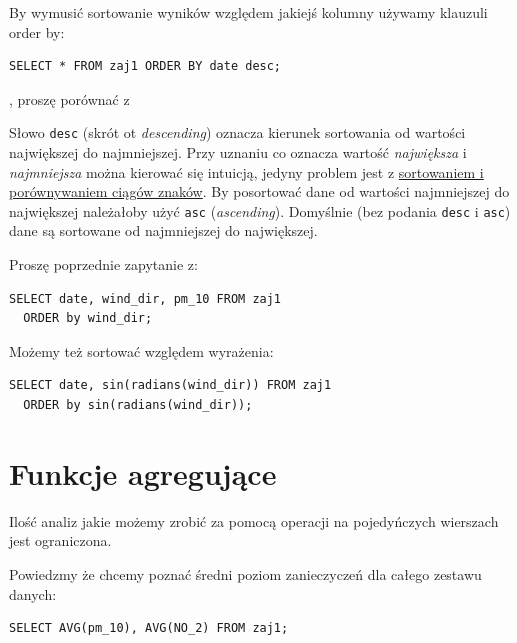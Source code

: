 \documentclass[a4paper]{article}
\begin{document}
By wymusić sortowanie wyników względem jakiejś kolumny używamy klauzuli
order by:

\begin{verbatim}
SELECT * FROM zaj1 ORDER BY date desc;
\end{verbatim}

, proszę porównać z

Słowo \texttt{desc} (skrót ot \emph{descending}) oznacza kierunek sortowania od wartości największej do najmniejszej.
Przy uznaniu co oznacza wartość \emph{największa} i \emph{najmniejsza} można kierować
się intuicją, jedyny problem jest z \href{https://www.google.com/search?q=postgresql+string+collation}{sortowaniem i porównywaniem ciągów znaków}.  By posortować
dane od wartości najmniejszej do największej należałoby użyć \texttt{asc} (\emph{ascending}).
Domyślnie (bez podania \texttt{desc} i \texttt{asc}) dane są sortowane od najmniejszej do
największej.

Proszę poprzednie zapytanie z:

\begin{verbatim}
SELECT date, wind_dir, pm_10 FROM zaj1
  ORDER by wind_dir;
\end{verbatim}


Możemy też sortować względem wyrażenia:

\begin{verbatim}
SELECT date, sin(radians(wind_dir)) FROM zaj1
  ORDER by sin(radians(wind_dir));
\end{verbatim}



\section{Funkcje agregujące%
  \label{funkcje-agregujace}%
}

Ilość analiz jakie możemy zrobić za pomocą operacji na pojedyńczych wierszach
jest ograniczona.

Powiedzmy że chcemy poznać średni poziom zanieczyczeń dla całego zestawu
danych:

\begin{verbatim}
SELECT AVG(pm_10), AVG(NO_2) FROM zaj1;
\end{verbatim}
\end{document}
